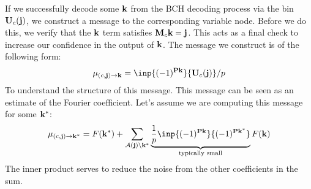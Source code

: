 If we successfully decode some $\mathbf k$ from the BCH decoding process via the bin $\mathbf U_{c}(\mathbf j)$, we construct a message to the corresponding variable node. Before we do this, we verify that the $\mathbf k$ term satisfies $\mathbf M_c \mathbf k = \mathbf j$. This acts as a final check to increase our confidence in the output of $\mathbf k$. The message we construct is of the following form:
\begin{equation}\label{eq:check_msg}
    \mu_{(c,\bj) \rightarrow \bk} = \inp{(-1)^{\bP \bk}}
        {\bU_c(\bj)}/p
\end{equation}
To understand the structure of this message. This message can be seen as an estimate of the Fourier coefficient. Let's assume we are computing this message for some $\mathbf k^*$:   
\begin{equation}
\mu_{(c,\bj) \rightarrow \bk^*} = F(\bk^*) + \sum_{\cA(\bj)\setminus \bk^*}\underbrace{\frac{1}{p}\inp{(-1)^{\bP \bk}}{(-1)^{\bP \bk^*}}}_{\text{typically small}}F(\bk)
\end{equation}
The inner product serves to reduce the noise from the other coefficients in the sum.
